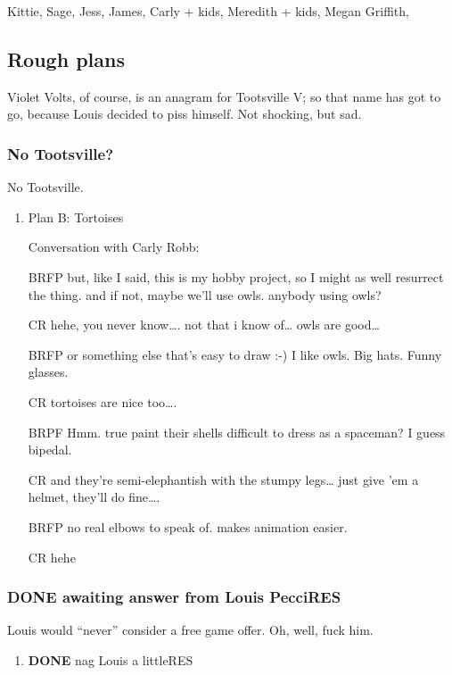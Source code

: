 \documentclass[11pt]{article}
\begin{document}
Kittie,  Sage, Jess,  James,  Carly  + kids,  Meredith  + kids,  Megan
Griffith, 
\subsection{Rough plans}
\label{sec-1-3}

Violet Volts,  of course, is an  anagram for Tootsville V; so that
name has got to go, because Louis decided to piss himself. Not
shocking, but sad.

\subsubsection{No Tootsville?}
\label{sec-1-3-1}

No Tootsville.

\begin{enumerate}
\item Plan B: Tortoises
\label{sec-1-3-1-1}

Conversation with Carly Robb:

BRFP but, like I said, this is my hobby project, so I might as well
     resurrect the thing.  and if not, maybe we'll use owls.
     anybody using owls?

CR hehe, you never know\ldots{}. not that i know of\ldots{}  owls are good\ldots{}

BRFP or something else that's easy to draw :-) I like owls.
     Big hats. Funny glasses.

CR tortoises are nice too\ldots{}.

BRPF Hmm.  true paint their shells difficult to dress as a spaceman?
     I guess bipedal.

CR and they're semi-elephantish with the stumpy legs\ldots{}  just give 'em
     a helmet, they'll do fine\ldots{}.

BRFP no real elbows to speak of.  makes animation easier.

CR hehe
\end{enumerate}

\subsubsection{{\bfseries\sffamily DONE} awaiting answer from Louis Pecci\hfill{}\textsc{RES}}
\label{sec-1-3-2}

Louis would “never” consider a free game offer. Oh, well, fuck him.

\begin{enumerate}
\item {\bfseries\sffamily DONE} nag Louis a little\hfill{}\textsc{RES}
\label{sec-1-3-2-1}
\end{enumerate}
\end{document}
